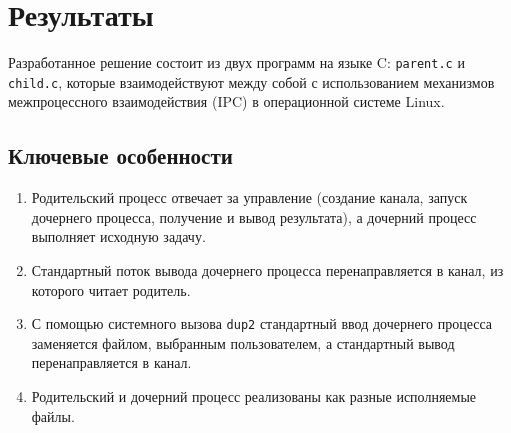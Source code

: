 \section{Результаты}

Разработанное решение состоит из двух программ на языке C: \texttt{parent.c} и \texttt{child.c}, 
которые взаимодействуют между собой с использованием механизмов межпроцессного взаимодействия (IPC) в операционной системе Linux.

\subsection*{Ключевые особенности}
\begin{enumerate}
    \item Родительский процесс отвечает за управление (создание канала, запуск дочернего процесса, получение и вывод результата), а дочерний процесс выполняет исходную задачу.
    \item Стандартный поток вывода дочернего процесса перенаправляется в канал, из которого читает родитель.
    \item С помощью системного вызова \texttt{dup2} стандартный ввод дочернего процесса заменяется файлом, выбранным пользователем, а стандартный вывод перенаправляется в канал.
    \item Родительский и дочерний процесс реализованы как разные исполняемые файлы.
\end{enumerate}
